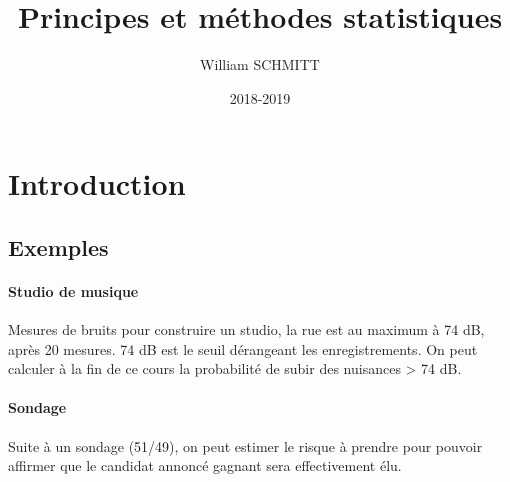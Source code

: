 \documentclass[11pt]{article}
\title{Principes et méthodes statistiques}
\author{William SCHMITT}
\date{2018-2019}
\begin{document}
\maketitle

\tableofcontents

\section{Introduction}

\subsection{Exemples}
\paragraph{Studio de musique} Mesures de bruits pour construire un studio, la
rue est au maximum à 74 dB, après 20 mesures. 74 dB est le seuil dérangeant 
les enregistrements. On peut calculer à la fin de ce cours la probabilité 
de subir des nuisances > 74 dB.

\paragraph{Sondage} Suite à un sondage (51/49), on peut estimer le risque à 
prendre pour pouvoir affirmer que le candidat annoncé gagnant sera effectivement
élu.
\end{document}

